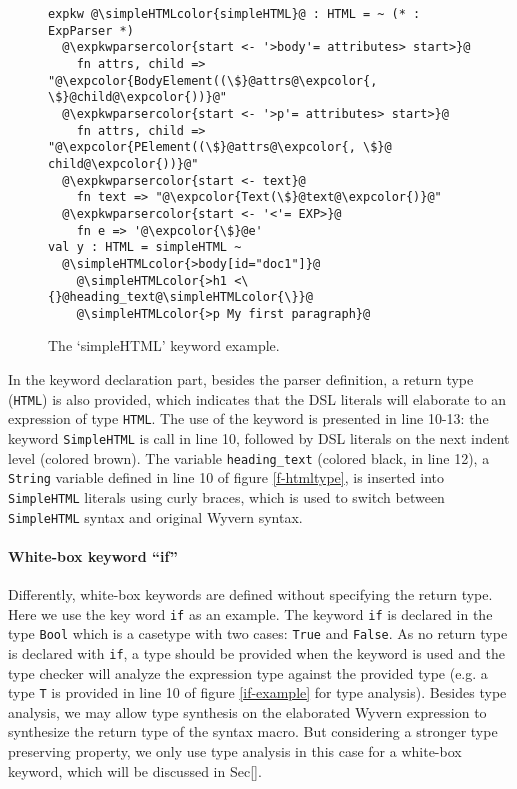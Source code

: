 \documentclass{sig-alternate}
\newcommand{\expkwparsercolor}[1]{\textcolor[HTML]{336699}{#1}}
\newcommand{\expcolor}[1]{\textcolor[HTML]{FF0033}{#1}}
\newcommand{\simpleHTMLcolor}[1]{\textcolor[HTML]{7D5100}{#1}}
\newcommand{\mycaption}[1]{\vspace{-4px}\caption{#1}\vspace{-2px}}
\begin{document}
\begin{figure}[ht]
\begin{lstlisting}[style=wyvern]
expkw @\simpleHTMLcolor{simpleHTML}@ : HTML = ~ (* : ExpParser *)
  @\expkwparsercolor{start <- '>body'= attributes> start>}@
    fn attrs, child => "@\expcolor{BodyElement((\$}@attrs@\expcolor{, \$}@child@\expcolor{))}@"
  @\expkwparsercolor{start <- '>p'= attributes> start>}@
    fn attrs, child => "@\expcolor{PElement((\$}@attrs@\expcolor{, \$}@ child@\expcolor{))}@"
  @\expkwparsercolor{start <- text}@
    fn text => "@\expcolor{Text(\$}@text@\expcolor{)}@"
  @\expkwparsercolor{start <- '<'= EXP>}@
    fn e => '@\expcolor{\$}@e'
val y : HTML = simpleHTML ~
  @\simpleHTMLcolor{>body[id="doc1"]}@
    @\simpleHTMLcolor{>h1 <\{}@heading_text@\simpleHTMLcolor{\}}@
    @\simpleHTMLcolor{>p My first paragraph}@
\end{lstlisting}
\mycaption{The `simpleHTML' keyword example.\todo{set uniform spacing for whole document}}
\label{f-simplehtml}
\end{figure}

In the keyword declaration part, besides the parser definition, a return type (\verb|HTML|) is also provided, which indicates that the DSL literals will elaborate to an expression of type \verb|HTML|. The use of the keyword is presented in line 10-13: the keyword \verb|SimpleHTML| is call in line 10, followed by DSL literals on the next indent level (colored brown). The variable \verb|heading_text| (colored black, in line 12), a \verb|String| variable defined in line 10 of figure \ref{f-htmltype}, is inserted into \verb|SimpleHTML| literals using curly braces, which is used to switch between \verb|SimpleHTML| syntax and original Wyvern syntax.


\paragraph{White-box keyword ``if''}
Differently, white-box keywords are defined without specifying the return type. Here we use the key word \verb|if| as an example. The keyword \verb|if| is declared in the type \verb|Bool| which is a casetype with two cases: \verb|True| and \verb|False|. As no return type is declared with \verb|if|, a type should be provided when the keyword is used and the type checker will analyze the expression type against the provided type (e.g. a type \verb|T| is provided in line 10 of figure \ref{if-example} for type analysis). Besides type analysis, we may allow type synthesis on the elaborated Wyvern expression to synthesize the return type of the syntax macro. But considering a stronger type preserving property, we only use type analysis in this case for a white-box keyword, which will be discussed in Sec[].
\end{document}
